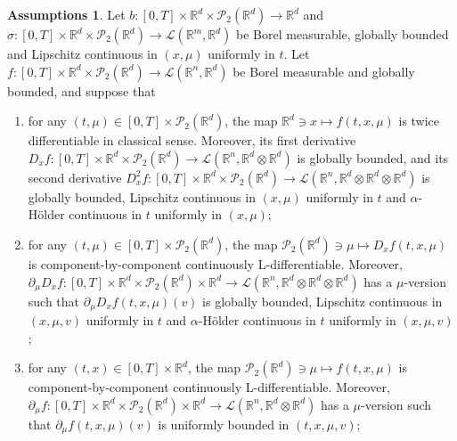 \documentclass[10pt, a4paper]{article} %
\newcommand{\R}{\mathbb{R}}
\theoremstyle{definition}
\newtheorem{assumptions}[defn]{Assumptions}
\theoremstyle{plain}
\begin{document}
\begin{assumptions} \label{assumptions_existence}
Let $b:[0,T] \times \R^d \times \mathcal{P}_2(\R^d) \to \R^d$ and $\sigma:[0,T] \times \R^d \times \mathcal{P}_2(\R^d) \to \mathscr{L}(\R^m,\R^d)$ be Borel measurable, globally bounded and Lipschitz continuous in $(x,\mu)$ uniformly in $t$.
Let $f:[0,T] \times \R^d \times \mathcal{P}_2(\R^d) \to \mathscr{L}(\R^n,\R^d)$ be Borel measurable and globally bounded, and suppose that  \begin{enumerate} \renewcommand{\labelenumi}{(\alph{enumi})}
        
        \item for any $(t, \mu) \in [0,T] \times \mathcal{P}_2 (\mathbb{R}^d)$, the map $\mathbb{R}^d \ni x \mapsto f (t, x, \mu)$ is twice differentiable in classical sense. Moreover, its first derivative $D_x f  : [0, T] \times \mathbb{R}^d \times \mathcal{P}_2    (\mathbb{R}^d) \rightarrow \mathscr{L} (\mathbb{R}^n , \mathbb{R}^d \otimes \mathbb{R}^d)$ is globally bounded, and its second derivative $D^2_xf  : [0, T] \times \mathbb{R}^d \times \mathcal{P}_2 (\mathbb{R}^d) \rightarrow \mathscr{L} (\mathbb{R}^n , \mathbb{R}^d \otimes \mathbb{R}^d \otimes \mathbb{R}^d)$ is globally bounded, Lipschitz continuous in $(x,\mu)$ uniformly in $t$ and $\alpha$-H\"older continuous in $t$ uniformly in $(x, \mu)$;
        
        \item for any $(t, \mu) \in [0,T] \times \mathcal{P}_2 (\mathbb{R}^d)$, the map $\mathcal{P}_2 (\mathbb{R}^d) \ni \mu \mapsto D_x f (t, x,\mu)$ is component-by-component continuously L-differentiable. Moreover, $\partial_{\mu} D_xf : [0, T] \times \mathbb{R}^d \times \mathcal{P}_2 (\mathbb{R}^d) \times \mathbb{R}^d \rightarrow \mathscr{L} (\mathbb{R}^n , \mathbb{R}^d\otimes \mathbb{R}^d \otimes \mathbb{R}^d)$ has a $\mu$-version such that $\partial_{\mu} D_x f (t, x, \mu) (v)$ is globally bounded, Lipschitz continuous in $(x, \mu, v)$ uniformly in $t$ and $\alpha$-H\"older continuous in $t$ uniformly in $(x, \mu, v)$;
        
        \item for any $(t, x) \in [0, T] \times \mathbb{R}^d$, the map $\mathcal{P}_2 (\mathbb{R}^d) \ni \mu \mapsto f (t, x, \mu)$ is component-by-component continuously L-differentiable. Moreover, $\partial_{\mu} f : [0, T] \times \mathbb{R}^d \times \mathcal{P}_2 (\mathbb{R}^d) \times \mathbb{R}^d \rightarrow \mathscr{L} (\mathbb{R}^n , \mathbb{R}^d \otimes \mathbb{R}^d)$ has a $\mu$-version such that $\partial_{\mu} f (t, x, \mu) (v)$ is uniformly bounded in $(t, x, \mu, v)$; 
    

\end{enumerate}
\end{assumptions}
\end{document}
